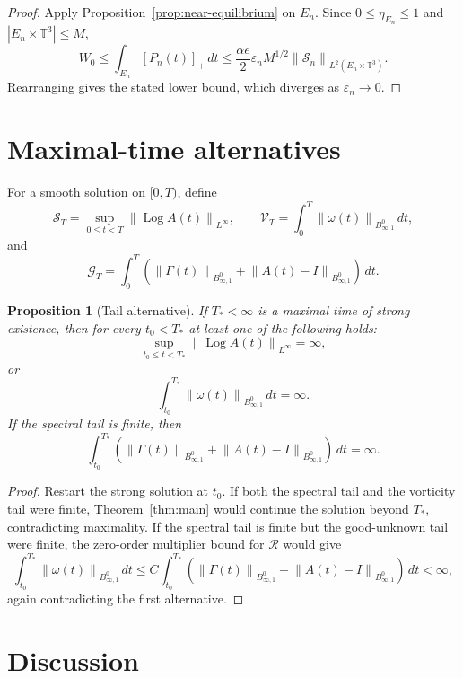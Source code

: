 \documentclass[10pt,a4paper]{amsart}
\numberwithin{equation}{section}
\newtheorem{proposition}[theorem]{Proposition}
\newcommand{\T}{\mathbb T}
\newcommand{\Id}{I}
\newcommand{\Log}{\operatorname{Log}}
\newcommand{\Besov}{B^0_{\infty,1}}
\newcommand{\calS}{\mathcal S}
\newcommand{\calR}{\mathcal R}
\newcommand{\norm}[1]{\left\lVert #1\right\rVert}
\begin{document}
\begin{proof}
Apply Proposition~\ref{prop:near-equilibrium} on \(E_n\).  Since
\(0\le\eta_{E_n}\le1\) and \(|E_n\times\T^3|\le M\),
\[
  W_0
  \le
  \int_{E_n}[P_n(t)]_+\,dt
  \le
  \frac{\alpha e}{2}
  \varepsilon_n M^{1/2}
  \norm{\calS_n}_{L^2(E_n\times\T^3)} .
\]
Rearranging gives the stated lower bound, which diverges as
\(\varepsilon_n\to0\).
\end{proof}

\section{Maximal-time alternatives}

For a smooth solution on \([0,T)\), define
\[
  \mathcal S_T=\sup_{0\le t<T}\norm{\Log A(t)}_{L^\infty},\qquad
  \mathcal V_T=\int_0^T\norm{\omega(t)}_{\Besov}\,dt,
\]
and
\[
  \mathcal G_T=
  \int_0^T
  \left(\norm{\Gamma(t)}_{\Besov}+\norm{A(t)-\Id}_{\Besov}\right)\,dt .
\]

\begin{proposition}[Tail alternative]
If \(T_*<\infty\) is a maximal time of strong existence, then for every
\(t_0<T_*\) at least one of the following holds:
\[
  \sup_{t_0\le t<T_*}\norm{\Log A(t)}_{L^\infty}=\infty,
\]
or
\[
  \int_{t_0}^{T_*}\norm{\omega(t)}_{\Besov}\,dt=\infty .
\]
If the spectral tail is finite, then
\[
  \int_{t_0}^{T_*}
  \left(\norm{\Gamma(t)}_{\Besov}+\norm{A(t)-\Id}_{\Besov}\right)\,dt=\infty .
\]
\end{proposition}

\begin{proof}
Restart the strong solution at \(t_0\).  If both the spectral tail and the
vorticity tail were finite, Theorem~\ref{thm:main} would continue the solution
beyond \(T_*\), contradicting maximality.  If the spectral tail is finite but
the good-unknown tail were finite, the zero-order multiplier bound for
\(\calR\) would give
\[
  \int_{t_0}^{T_*}\norm{\omega(t)}_{\Besov}\,dt
  \le
  C\int_{t_0}^{T_*}
  \left(\norm{\Gamma(t)}_{\Besov}
  +\norm{A(t)-\Id}_{\Besov}\right)\,dt
  <\infty,
\]
again contradicting the first alternative.
\end{proof}

\section{Discussion}
\end{document}
